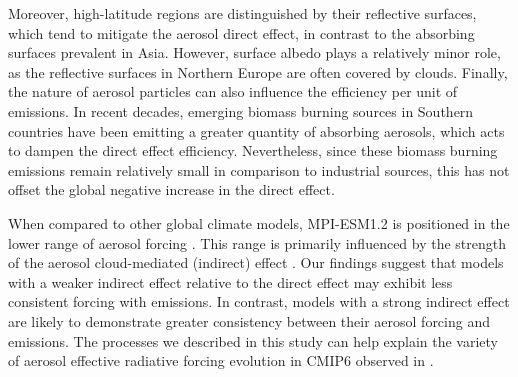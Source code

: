 \documentclass[draft]{agujournal2019}
\begin{document}
      Moreover, high-latitude regions are distinguished by their reflective surfaces, which tend to mitigate the aerosol direct effect, in contrast to the absorbing surfaces prevalent in Asia. However, surface albedo plays a relatively minor role, as the reflective surfaces in Northern Europe are often covered by clouds.
      Finally, the nature of aerosol particles can also influence the efficiency per unit of emissions. In recent decades, emerging biomass burning sources in Southern countries have been emitting a greater quantity of absorbing aerosols, which acts to dampen the direct effect efficiency. Nevertheless, since these biomass burning emissions remain relatively small in comparison to industrial sources, this has not offset the global negative increase in the direct effect.

      When compared to other global climate models, MPI-ESM1.2 is positioned in the lower range of aerosol forcing \cite{Flynn_2023}. This range is primarily influenced by the strength of the aerosol cloud-mediated (indirect) effect \cite{Fiedler_2023}. Our findings suggest that models with a weaker indirect effect relative to the direct effect may exhibit less consistent forcing with emissions. In contrast, models with a strong indirect effect are likely to demonstrate greater consistency between their aerosol forcing and emissions.
      The processes we described in this study can help explain the variety of aerosol effective radiative forcing evolution in CMIP6 observed in .
      



%
%
\end{document}
